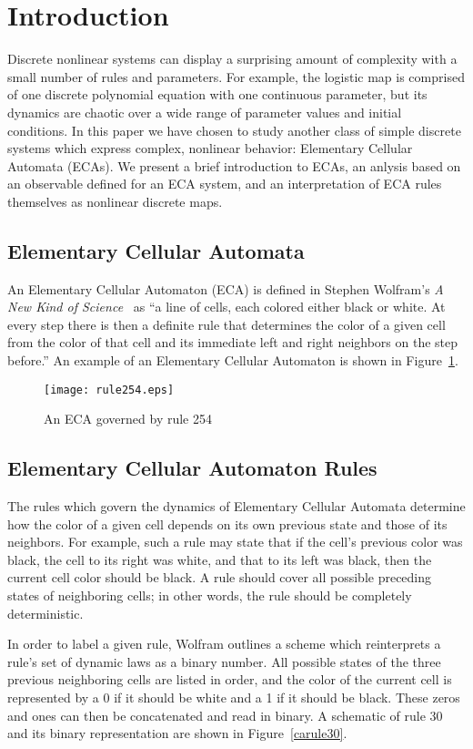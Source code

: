 \section{Introduction}
Discrete nonlinear systems can display a surprising amount of
complexity with a small number of rules and parameters.
For example, the logistic map is comprised of one discrete polynomial
equation with one continuous parameter, but its dynamics are chaotic
over a wide range of parameter values and initial conditions.
In this paper we have chosen to study another class of simple discrete
systems which express complex, nonlinear behavior: Elementary Cellular
Automata (ECAs).
We present a brief introduction to ECAs, an anlysis based on an
observable defined for an ECA system, and an interpretation of ECA
rules themselves as nonlinear discrete maps.


\subsection{Elementary Cellular Automata}
An Elementary Cellular Automaton (ECA) is defined in Stephen Wolfram's
\emph{A New Kind of Science}~\cite{anks} as ``a line of cells, each
colored either black or white. At every step there is then a definite
rule that determines the color of a given cell from the color of that
cell and its immediate left and right neighbors on the step before.''
An example of an Elementary Cellular Automaton is shown in
Figure~\ref{rule254}.

\begin{figure}
    \centering
    \texttt{[image: rule254.eps]}
    \caption{\label{rule254} An ECA governed by rule 254}
\end{figure}


\subsection{Elementary Cellular Automaton Rules}
The rules which govern the dynamics of Elementary Cellular Automata
determine how the color of a given cell depends on its own previous
state and those of its neighbors.
For example, such a rule may state that if the cell's previous color
was black, the cell to its right was white, and that to its left was
black, then the current cell color should be black.
A rule should cover all possible preceding states of neighboring
cells; in other words, the rule should be completely deterministic.

In order to label a given rule, Wolfram outlines a scheme which
reinterprets a rule's set of dynamic laws as a binary number.
All possible states of the three previous neighboring cells are listed
in order, and the color of the current cell is represented by a 0 if
it should be white and a 1 if it should be black.
These zeros and ones can then be concatenated and read in binary.
A schematic of rule 30 and its binary representation are shown
in Figure~\ref{carule30}.

